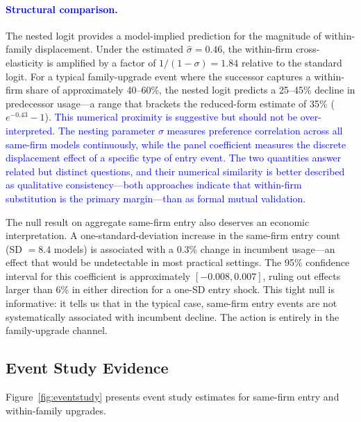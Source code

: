 \documentclass[11pt, a4paper]{article}
\begin{document}
\textcolor{blue}{\paragraph{Structural comparison.}} The nested logit provides a model-implied prediction for the magnitude of within-family displacement. Under the estimated $\hat{\sigma} = 0.46$, the within-firm cross-elasticity is amplified by a factor of $1/(1-\sigma) = 1.84$ relative to the standard logit. For a typical family-upgrade event where the successor captures a within-firm share of approximately 40--60\%, the nested logit predicts a 25--45\% decline in predecessor usage---a range that brackets the reduced-form estimate of 35\% ($e^{-0.43} - 1$). \textcolor{blue}{This numerical proximity is suggestive but should not be over-interpreted. The nesting parameter $\sigma$ measures preference correlation across all same-firm models continuously, while the panel coefficient measures the discrete displacement effect of a specific type of entry event. The two quantities answer related but distinct questions, and their numerical similarity is better described as qualitative consistency---both approaches indicate that within-firm substitution is the primary margin---than as formal mutual validation.}

The null result on aggregate same-firm entry also deserves an economic interpretation. A one-standard-deviation increase in the same-firm entry count (SD $= 8.4$ models) is associated with a 0.3\% change in incumbent usage---an effect that would be undetectable in most practical settings. The 95\% confidence interval for this coefficient is approximately $[-0.008, 0.007]$, ruling out effects larger than 6\% in either direction for a one-SD entry shock. This tight null is informative: it tells us that in the typical case, same-firm entry events are not systematically associated with incumbent decline. The action is entirely in the family-upgrade channel.

\subsection{Event Study Evidence}

Figure~\ref{fig:eventstudy} presents event study estimates for same-firm entry and within-family upgrades.
\end{document}
